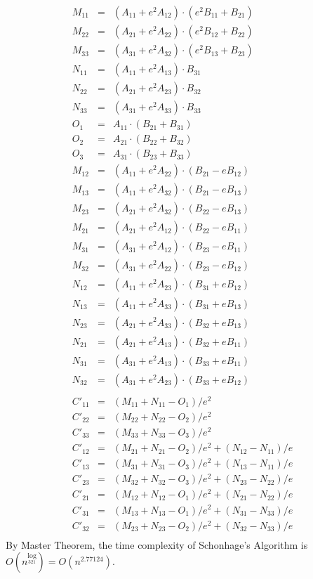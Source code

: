 \documentclass{article}
\begin{document}
\begin{eqnarray*}
M_{11} &=& (A_{11} + e^2A_{12})\cdot (e^2B_{11} + B_{21})\\
M_{22} &=& (A_{21} + e^2A_{22})\cdot (e^2B_{12} + B_{22})\\ 
M_{33} &=& (A_{31} + e^2A_{32})\cdot (e^2B_{13} + B_{23})\\
N_{11} &=& (A_{11} + e^2A_{13})\cdot B_{31}\\
N_{22} &=& (A_{21} + e^2A_{23})\cdot B_{32}\\
N_{33} &=& (A_{31} + e^2A_{33})\cdot B_{33}\\
O_1 &=& A_{11}\cdot (B_{21} + B_{31})\\
O_2 &=& A_{21}\cdot (B_{22} + B_{32})\\
O_3 &=& A_{31}\cdot (B_{23} + B_{33})\\
M_{12} &=& (A_{11} + e^2A_{22})\cdot (B_{21} - eB_{12})\\
M_{13} &=& (A_{11} + e^2A_{32})\cdot (B_{21} - eB_{13})\\
M_{23} &=& (A_{21} + e^2A_{32})\cdot (B_{22} - eB_{13})\\
M_{21} &=& (A_{21} + e^2A_{12})\cdot (B_{22} - eB_{11})\\
M_{31} &=& (A_{31} + e^2A_{12})\cdot (B_{23} - eB_{11})\\
M_{32} &=& (A_{31} + e^2A_{22})\cdot (B_{23} - eB_{12})\\
N_{12} &=& (A_{11} + e^2A_{23})\cdot (B_{31} + eB_{12})\\
N_{13} &=& (A_{11} + e^2A_{33})\cdot (B_{31} + eB_{13})\\
N_{23} &=& (A_{21} + e^2A_{33})\cdot (B_{32} + eB_{13})\\
N_{21} &=& (A_{21} + e^2A_{13})\cdot (B_{32} + eB_{11})\\
N_{31} &=& (A_{31} + e^2A_{13})\cdot (B_{33} + eB_{11})\\
N_{32} &=& (A_{31} + e^2A_{23})\cdot (B_{33} + eB_{12})\\\\
C'_{11} &=& (M_{11} + N_{11} - O_1)/e^2\\
C'_{22} &=& (M_{22} + N_{22} - O_2)/e^2\\
C'_{33} &=& (M_{33} + N_{33} - O_3)/e^2\\
C'_{12} &=& (M_{21} + N_{21} - O_2)/e^2 + (N_{12} - N_{11})/e\\
C'_{13} &=& (M_{31} + N_{31} - O_3)/e^2 + (N_{13} - N_{11})/e\\
C'_{23} &=& (M_{32} + N_{32} - O_3)/e^2 + (N_{23} - N_{22})/e\\
C'_{21} &=& (M_{12} + N_{12} - O_1)/e^2 + (N_{21} - N_{22})/e\\
C'_{31} &=& (M_{13} + N_{13} - O_1)/e^2 + (N_{31} - N_{33})/e\\
C'_{32} &=& (M_{23} + N_{23} - O_2)/e^2 + (N_{32} - N_{33})/e\\
\end{eqnarray*}
By Master Theorem, the time complexity of Schonhage's Algorithm is $O(n^{\log\limits_321}) = O(n^{2.77124})$.
\end{document}
